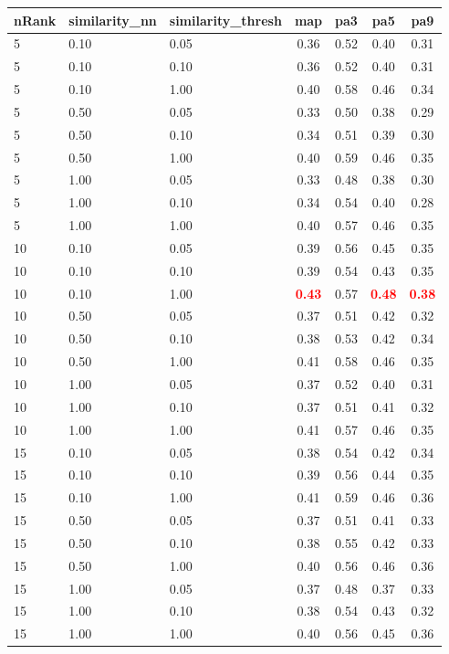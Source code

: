 \begin{tabular}{lllcccc} 
nRank & similarity\_nn & similarity\_thresh & map & pa3 & pa5 & pa9 \\ 
\hline 
 5 & 0.10 & 0.05 & 0.36 & 0.52 & 0.40 & 0.31 \\ 
 5 & 0.10 & 0.10 & 0.36 & 0.52 & 0.40 & 0.31 \\ 
 5 & 0.10 & 1.00 & 0.40 & 0.58 & 0.46 & 0.34 \\ 
 5 & 0.50 & 0.05 & 0.33 & 0.50 & 0.38 & 0.29 \\ 
 5 & 0.50 & 0.10 & 0.34 & 0.51 & 0.39 & 0.30 \\ 
 5 & 0.50 & 1.00 & 0.40 & 0.59 & 0.46 & 0.35 \\ 
 5 & 1.00 & 0.05 & 0.33 & 0.48 & 0.38 & 0.30 \\ 
 5 & 1.00 & 0.10 & 0.34 & 0.54 & 0.40 & 0.28 \\ 
 5 & 1.00 & 1.00 & 0.40 & 0.57 & 0.46 & 0.35 \\ 
10 & 0.10 & 0.05 & 0.39 & 0.56 & 0.45 & 0.35 \\ 
10 & 0.10 & 0.10 & 0.39 & 0.54 & 0.43 & 0.35 \\ 
10 & 0.10 & 1.00 & \textbf{\textcolor{red}{0.43}} & 0.57 & \textbf{\textcolor{red}{0.48}} & \textbf{\textcolor{red}{0.38}} \\ 
10 & 0.50 & 0.05 & 0.37 & 0.51 & 0.42 & 0.32 \\ 
10 & 0.50 & 0.10 & 0.38 & 0.53 & 0.42 & 0.34 \\ 
10 & 0.50 & 1.00 & 0.41 & 0.58 & 0.46 & 0.35 \\ 
10 & 1.00 & 0.05 & 0.37 & 0.52 & 0.40 & 0.31 \\ 
10 & 1.00 & 0.10 & 0.37 & 0.51 & 0.41 & 0.32 \\ 
10 & 1.00 & 1.00 & 0.41 & 0.57 & 0.46 & 0.35 \\ 
15 & 0.10 & 0.05 & 0.38 & 0.54 & 0.42 & 0.34 \\ 
15 & 0.10 & 0.10 & 0.39 & 0.56 & 0.44 & 0.35 \\ 
15 & 0.10 & 1.00 & 0.41 & 0.59 & 0.46 & 0.36 \\ 
15 & 0.50 & 0.05 & 0.37 & 0.51 & 0.41 & 0.33 \\ 
15 & 0.50 & 0.10 & 0.38 & 0.55 & 0.42 & 0.33 \\ 
15 & 0.50 & 1.00 & 0.40 & 0.56 & 0.46 & 0.36 \\ 
15 & 1.00 & 0.05 & 0.37 & 0.48 & 0.37 & 0.33 \\ 
15 & 1.00 & 0.10 & 0.38 & 0.54 & 0.43 & 0.32 \\ 
15 & 1.00 & 1.00 & 0.40 & 0.56 & 0.45 & 0.36 \\ 

\end{tabular}
